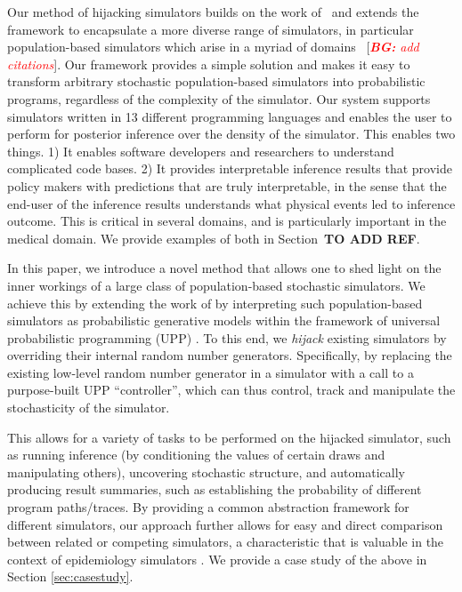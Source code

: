 \documentclass{article}
\newcommand{\bg}[1]{~{{[{\it \textcolor{red}{{\bf BG:} #1}}]}}}
\begin{document}
    
Our method of hijacking simulators builds on the work of~\cite{baydin2018efficient} and extends the framework to encapsulate a more diverse range of simulators, in particular population-based simulators which arise
in a myriad of domains \bg{add citations}. 
Our framework provides a simple solution and makes it easy to transform arbitrary stochastic population-based simulators into probabilistic programs, regardless of the complexity of the simulator. 
Our system supports simulators written in 13 different programming languages and enables the user to perform for posterior inference over the density of the simulator. 
This enables two things.
1) It enables software developers and researchers to understand complicated code bases. 
2) It provides interpretable inference results that provide policy makers with predictions that are truly interpretable, in the sense that the end-user of the inference results understands what physical events led to inference outcome. 
This is critical in several domains, and is particularly important in the medical domain. We provide examples of both in Section~\textbf{TO ADD REF}.


In this paper, we introduce a novel method that allows one to shed light on the inner workings of a large class of population-based stochastic simulators. We achieve this by extending the work of \citep{baydin2018efficient} by interpreting such population-based simulators as probabilistic generative models within the framework of universal probabilistic programming (UPP) \cite{le-2016-inference}. To this end, we \emph{hijack} existing simulators by overriding their internal random number generators.  Specifically, by replacing the existing low-level random number generator in a simulator with a call to a purpose-built UPP ``controller'', which can thus control, track and manipulate the stochasticity of the simulator.

This allows for a variety of tasks to be performed on
the hijacked simulator, such as running inference (by conditioning
the values of certain draws and manipulating others),
uncovering stochastic structure, and automatically
producing result summaries, such as establishing the probability
of different program paths/traces.  By providing a common abstraction 
framework for different simulators, our approach further allows for
easy and direct comparison between related or competing
simulators, a characteristic that is valuable in the context of
epidemiology simulators \cite{ferris_openmalaria_2015}. We provide a case study of the above in Section \ref{sec:casestudy}.
\end{document}
